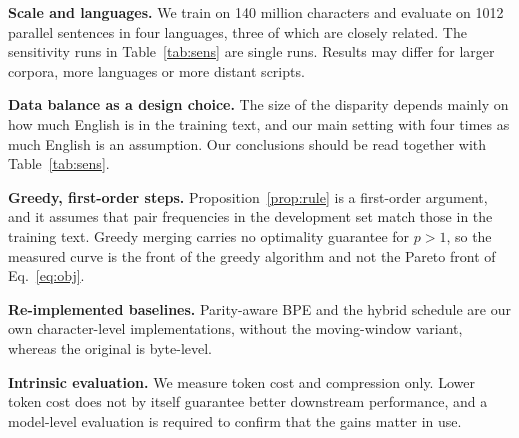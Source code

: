 \noindent\textbf{Scale and languages.} We train on 140 million characters and evaluate on
1012 parallel sentences in four languages, three of which are closely related. The
sensitivity runs in Table~\ref{tab:sens} are single runs. Results may differ for larger
corpora, more languages or more distant scripts.

\noindent\textbf{Data balance as a design choice.} The size of the disparity depends mainly
on how much English is in the training text, and our main setting with four times as much
English is an assumption. Our conclusions should be read together with
Table~\ref{tab:sens}.

\noindent\textbf{Greedy, first-order steps.} Proposition~\ref{prop:rule} is a first-order
argument, and it assumes that pair frequencies in the development set match those in the
training text. Greedy merging carries no optimality guarantee for $p>1$, so the measured
curve is the front of the greedy algorithm and not the Pareto front of Eq.~\eqref{eq:obj}.

\noindent\textbf{Re-implemented baselines.} Parity-aware BPE and the hybrid schedule are our
own character-level implementations, without the moving-window variant, whereas the
original is byte-level.

\noindent\textbf{Intrinsic evaluation.} We measure token cost and compression only. Lower
token cost does not by itself guarantee better downstream performance, and a model-level
evaluation is required to confirm that the gains matter in use.